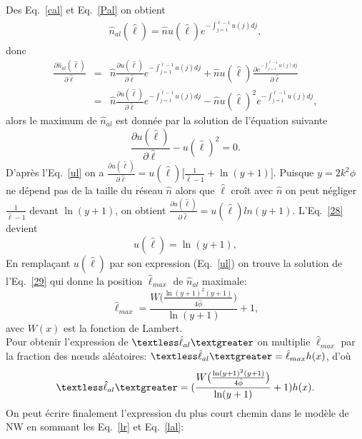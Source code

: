  Des Eq.~\eqref{cal} et Eq.~\eqref{Pal} on obtient
\begin{eqnarray}
\hat{n}_{al}(\hat{\ell})=\hat{n}u(\hat{\ell})e^{-\int_{j=1}^{\hat{\ell}-1}u(j)dj},
\end{eqnarray}
donc 
\begin{eqnarray}
\frac{\partial \hat{n}_{al}(\hat{\ell})}{\partial \hat{\ell}}&=&\hat{n}\frac{\partial u(\hat{\ell})}{\partial \hat{\ell}}e^{-\int_{j=1}^{\hat{\ell}-1}u(j)dj}+\hat{n}u(\hat{\ell})\frac{\partial e^{-\int_{j=1}^{\hat{\ell}-1}u(j)dj}}{\partial \hat{\ell}}\\\nonumber
&=&\hat{n}\frac{\partial u(\hat{\ell})}{\partial \hat{\ell}}e^{-\int_{j=1}^{\hat{\ell}-1}u(j)dj}-\hat{n}u(\hat{\ell})^2e^{-\int_{j=1}^{\hat{\ell}-1}u(j)dj},\nonumber
\end{eqnarray}
alors le maximum de $\hat{n}_{al}$ est donnée par la solution de l'équation suivante
\begin{equation}
\frac{\partial u(\hat{\ell})}{\partial \hat{\ell}}-u(\hat{\ell})^2=0.
\label{28}
\end{equation}
D'après l'Eq.~\eqref{ul} on a $\frac{\partial u(\hat{\ell})}{\partial \hat{\ell}}=u(\hat{\ell})\big[\frac{1}{\hat{\ell}-1}+\ln(y+1)\big]$. Puisque $y=2k^2\phi$ ne dépend pas de la taille du réseau $\hat{n}$ alors que  $\hat{\ell}$ croît avec $\hat{n}$ on peut négliger $\frac{1}{\hat{\ell}-1}$ devant $\ln(y+1)$, on obtient $\frac{\partial u(\hat{\ell})}{\partial \hat{\ell}}=u(\hat{\ell})ln(y+1)$. L'Eq.~\eqref{28} devient
\begin{equation}
u(\hat{\ell})=\ln(y+1),
\label{29}
\end{equation}
En remplaçant $u(\hat{\ell})$ par son expression (Eq.~\eqref{ul}) on trouve la solution de l'Eq.~\eqref{29} qui  
donne la position $\hat{\ell}_{max}$ de $\hat{n}_{al}$ maximale:
\begin{equation}
\hat{\ell}_{max}=\frac{W\big(\frac{\ln(y+1)^2(y+1)}{4\hat{\phi}}\big)}{\ln(y+1)}+1,
\end{equation}
avec $W(x)$ est la fonction de Lambert.\\
Pour obtenir l'expression de $\textless \hat{\ell}_{al} \textgreater$ on multiplie $\hat{\ell}_{max}$  par la fraction des nœuds aléatoires: $\textless \hat{\ell}_{al} \textgreater=\hat{\ell}_{max}h(x)$, d'où 
\begin{equation}
\textless \hat{\ell}_{al} \textgreater=(\frac{W\big(\frac{\ln(y+1)^2(y+1)}{4\hat{\phi}}\big)}{\ln(y+1)}+1)h(x).
\label{lal}
\end{equation}
On peut écrire finalement l'expression du plus court chemin dans le modèle de NW en sommant les Eq.~\eqref{lr} et Eq.~\eqref{lal}: 
